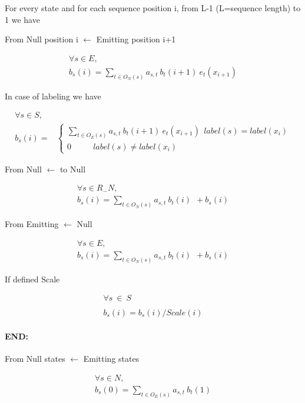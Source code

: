 \documentclass[11pt,english]{article}
\begin{document}
For every state and for each sequence position
i, from L-1 (L=sequence length) to 1 we have

From Null position i \( \leftarrow  \) Emitting position i+1

\begin{eqnarray*}
\forall s\in E,\\
b_{s}(i)=\sum _{t\in O_{N}(s)}a_{s,t}\: b_{t}(i+1)\: e_{t}(x_{i+1})
\end{eqnarray*}

In case of labeling we have

\begin{eqnarray*}
\forall s\in S,&\\
b_{s}(i)=&\left\{ \begin{array}{c}
\sum _{t\in O_{E}(s)}a_{s,t}\: b_{t}(i+1)\: e_{t}(x_{i+1})\: \: label(s)=label(x_{i})\\
0\: \: \: \: \: \: \: \: \: \: \: \: label(s)\neq label(x_{i})
\end{array}\right. 
\end{eqnarray*}


From Null \( \leftarrow  \) to Null 

\[
\begin{array}{c}
\forall s\in R_{-}N,\\
b_{s}(i)=\sum _{t\in O_{N}(s)}a_{s,t}\: b_{t}(i)\: \: +b_{s}(i)
\end{array}\]


From Emitting \( \leftarrow  \) Null 

\[
\begin{array}{c}
\forall s\in E,\\
b_{s}(i)=\sum _{t\in O_{N}(s)}a_{s,t}\: b_{t}(i)\: \: +b_{s}(i)
\end{array}\]

If defined Scale

\[
\begin{array}{c}
\forall s\: \in \: S\: \: \: \: \: \: \: \: \: \: \: \: \: \: \: \\
\\
b_{s}(i)=b_{s}(i)/Scale(i)
\end{array}\]


\paragraph{END:}


From Null states \( \leftarrow  \) Emitting states  

\[
\begin{array}{c}
\forall s\in N,\\
b_{s}(0)=\sum _{t\in O_{E}(s)}a_{s,t}\: b_{t}(1)
\end{array}\]
\end{document}
